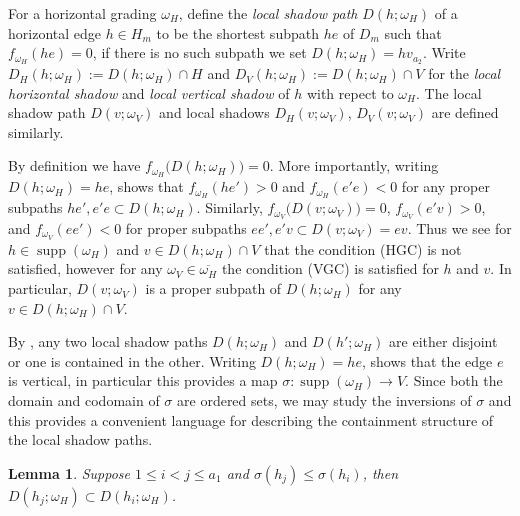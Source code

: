 \documentclass{amsart}
\newtheorem{lemma}[theorem]{Lemma}
\newcommand{\supp}{\operatorname{supp}}
\begin{document}
For a horizontal grading $\omega_H$, define the \emph{local shadow path} $D(h;\omega_H)$ of a horizontal edge $h\in H_m$ to be the shortest subpath $he$ of $D_m$ such that $f_{\omega_H}(he)=0$, if there is no such subpath we set $D(h;\omega_H)=hv_{a_2}$.  Write $D_H(h;\omega_H):=D(h;\omega_H)\cap H$ and $D_V(h;\omega_H):=D(h;\omega_H)\cap V$ for the \emph{local horizontal shadow} and \emph{local vertical shadow} of $h$ with repect to $\omega_H$.  The local shadow path $D(v;\omega_V)$ and local shadows $D_H(v;\omega_V)$, $D_V(v;\omega_V)$ are defined similarly.

By definition we have $f_{\omega_H}\big(D(h;\omega_H)\big)=0$.  More importantly, writing $D(h;\omega_H)=he$, \cite[Lemma~4.8]{rupel2} shows that $f_{\omega_H}(he')>0$ and $f_{\omega_H}(e'e)<0$ for any proper subpaths $he',e'e\subset D(h;\omega_H)$.  Similarly, $f_{\omega_V}\big(D(v;\omega_V)\big)=0$, $f_{\omega_V}(e'v)>0$, and $f_{\omega_V}(ee')<0$ for proper subpaths $ee',e'v\subset D(v;\omega_V)=ev$.  Thus we see for $h\in\supp(\omega_H)$ and $v\in D(h;\omega_H)\cap V$ that the condition (HGC) is not satisfied, however for any $\omega_V\in\overline{\omega_H}$ the condition (VGC) is satisfied for $h$ and $v$.  In particular, $D(v;\omega_V)$ is a proper subpath of $D(h;\omega_H)$ for any $v\in D(h;\omega_H)\cap V$.

By \cite[Lemma~4.10]{rupel2}, any two local shadow paths $D(h;\omega_H)$ and $D(h';\omega_H)$ are either disjoint or one is contained in the other.  Writing $D(h;\omega_H)=he$, \cite[Lemma~4.8]{rupel2} shows that the edge $e$ is vertical, in particular this provides a map $\sigma:\supp(\omega_H)\to V$.  Since both the domain and codomain of $\sigma$ are ordered sets, we may study the inversions of $\sigma$ and this provides a convenient language for describing the containment structure of the local shadow paths.
\begin{lemma}
 Suppose $1\le i<j\le a_1$ and $\sigma(h_j)\le\sigma(h_i)$, then $D(h_j;\omega_H)\subset D(h_i;\omega_H)$.
\end{lemma}
\end{document}
